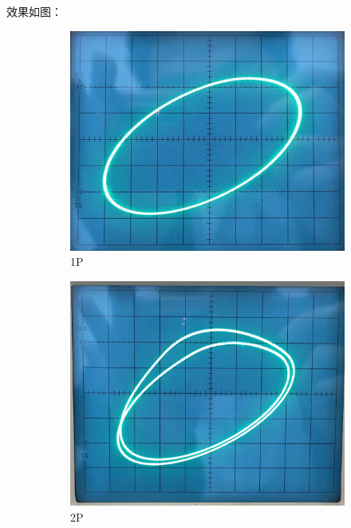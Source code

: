 \documentclass[12pt,a4paper]{article}
\begin{document}
效果如图：
\begin{figure}[H]
    \centering
    \begin{subfigure}[b]{0.3\textwidth}
      \centering
      \includegraphics[width=\textwidth]{1P.png}
      \caption{1P}
    \end{subfigure}
    \hfill
    \begin{subfigure}[b]{0.3\textwidth}
      \centering
      \includegraphics[width=\textwidth]{2P.png}
      \caption{2P}
    \end{subfigure}
    \hfill
    \begin{subfigure}[b]{0.3\textwidth}

\end{subfigure}
\end{figure}
\end{document}
